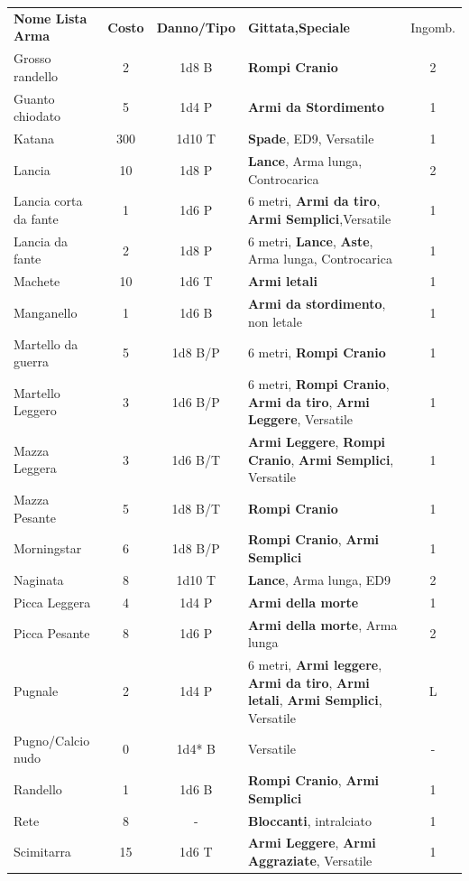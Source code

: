 \documentclass[a4paper,11pt,twoside,openany]{book}
\begin{document}
\begin{tabularx}{0.95\textwidth}{lccXc}
	\textbf{Nome Lista Arma}& \textbf{Costo} & \textbf{Danno/Tipo} & \textbf{Gittata,Speciale} & Ingomb.\\
	Grosso randello& 2& 1d8 B&\textbf{Rompi Cranio}& 2\\
	Guanto chiodato& 5& 1d4 P&\textbf{Armi da Stordimento}& 1\\
	Katana& 300& 1d10 T& \textbf{Spade}, ED9, Versatile& 1\\
	Lancia& 10 & 1d8 P&\textbf{Lance}, Arma lunga, Controcarica& 2\\
	Lancia corta da fante& 1& 1d6 P& 6 metri, \textbf{Armi da tiro},\textbf{ Armi Semplici},Versatile & 1\\
	Lancia da fante& 2& 1d8 P&6 metri, \textbf{Lance}, \textbf{Aste}, Arma lunga, Controcarica& 1 \\
	Machete& 10 & 1d6 T&\textbf{Armi letali} & 1\\
	Manganello& 1& 1d6 B& \textbf{Armi da stordimento}, non letale& 1\\
	Martello da guerra& 5& 1d8 B/P& 6 metri, \textbf{Rompi Cranio}& 1\\
	Martello Leggero& 3& 1d6 B/P& 6 metri, \textbf{Rompi Cranio}, \textbf{Armi da tiro}, \textbf{Armi Leggere}, Versatile & 1\\
	Mazza Leggera& 3& 1d6 B/T& \textbf{Armi Leggere}, \textbf{Rompi Cranio}, \textbf{Armi Semplici}, Versatile&1\\
	Mazza Pesante& 5& 1d8 B/T& \textbf{Rompi Cranio}& 1\\
	Morningstar& 6& 1d8 B/P&\textbf{Rompi Cranio},\textbf{ Armi Semplici}& 1\\
	Naginata& 8& 1d10 T&\textbf{Lance}, Arma lunga, ED9& 2\\
	Picca Leggera& 4& 1d4 P&\textbf{Armi della morte}& 1\\
	Picca Pesante& 8& 1d6 P&\textbf{Armi della morte}, Arma lunga& 2\\
	Pugnale& 2& 1d4 P& 6 metri, \textbf{Armi leggere}, \textbf{Armi da tiro}, \textbf{Armi letali}, \textbf{Armi Semplici}, Versatile& L\\
	Pugno/Calcio nudo& 0& 1d4* B&Versatile& -\\
	Randello& 1& 1d6 B&\textbf{Rompi Cranio}, \textbf{Armi Semplici}& 1\\
	Rete& 8& -&\textbf{Bloccanti}, intralciato& 1\\
	Scimitarra& 15 & 1d6 T&\textbf{Armi Leggere}, \textbf{Armi Aggraziate}, Versatile& 1\\

\end{tabularx}
\end{document}
